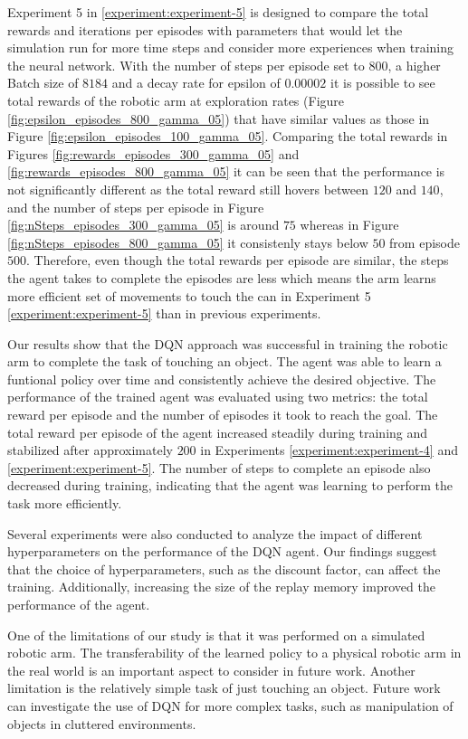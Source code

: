 \documentclass[12pt,oneside]{article}
\begin{document}
Experiment 5 in \ref{experiment:experiment-5} is designed to compare the total rewards and iterations per episodes with parameters that would let the simulation run for more time steps and consider more experiences when training the neural network. With the number of steps per episode set to $800$, a higher Batch size of $8184$ and a decay rate for epsilon of $0.00002$ it is possible to see total rewards of the robotic arm at exploration rates (Figure \ref{fig:epsilon_episodes_800_gamma_05}) that have similar values as those in Figure \ref{fig:epsilon_episodes_100_gamma_05}. Comparing the total rewards in Figures \ref{fig:rewards_episodes_300_gamma_05} and \ref{fig:rewards_episodes_800_gamma_05} it can be seen that the performance is not significantly different as the total reward still hovers between $120$ and $140$, and the number of steps per episode in Figure \ref{fig:nSteps_episodes_300_gamma_05} is around $75$ whereas in Figure \ref{fig:nSteps_episodes_800_gamma_05} it consistenly stays below $50$ from episode $500$. Therefore, even though the total rewards per episode are similar, the steps the agent takes to complete the episodes are less which means the arm learns more efficient set of movements to touch the can in Experiment 5 \ref{experiment:experiment-5} than in previous experiments.

Our results show that the DQN approach was successful in training the robotic arm to complete the task of touching an object. The agent was able to learn a funtional policy over time and consistently achieve the desired objective. The performance of the trained agent was evaluated using two metrics: the total reward per episode and the number of episodes it took to reach the goal. The total reward per episode of the agent increased steadily during training and stabilized after approximately $200$ in Experiments \ref{experiment:experiment-4} and \ref{experiment:experiment-5}. The number of steps to complete an episode also decreased during training, indicating that the agent was learning to perform the task more efficiently.

Several experiments were also conducted to analyze the impact of different hyperparameters on the performance of the DQN agent. Our findings suggest that the choice of hyperparameters, such as the discount factor, can affect the training. Additionally, increasing the size of the replay memory  improved the performance of the agent.

One of the limitations of our study is that it was performed on a simulated robotic arm. The transferability of the learned policy to a physical robotic arm in the real world is an important aspect to consider in future work. Another limitation is the relatively simple task of just touching an object. Future work can investigate the use of DQN for more complex tasks, such as manipulation of objects in cluttered environments.
\end{document}
